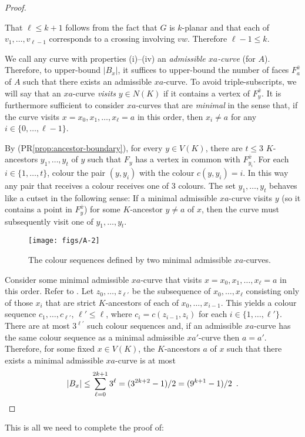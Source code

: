 \documentclass{patmorin}
\renewcommand{\propref}[1]{(PR\ref{prop:#1})}
\begin{document}
\begin{proof}
\begin{compactenum}[(i)]
    \item That $\ell\le k+1$ follows from the fact that $G$ is $k$-planar and that each of $v_1,\ldots,v_{\ell-1}$ corresponds to a crossing involving $vw$.  Therefore $\ell-1\le k$.
  \end{compactenum}
  We call any curve with properties (i)--(iv) an \emph{admissible $xa$-curve} (for $A$).  Therefore, to upper-bound $|B_x|$, it suffices to upper-bound the number of faces $F^{\bar{x}}_a$ of $A$ such that there exists an admissible $xa$-curve. To avoid triple-subscripts, we will say that an $xa$-curve \emph{visits} $y\in N(K)$ if it contains a vertex of $F^{\bar{x}}_y$.  It is furthermore sufficient to consider $xa$-curves that are \emph{minimal} in the sense that, if the curve visits $x=x_0,x_1,\ldots,x_\ell=a$ in this order, then $x_i\neq a$ for any $i\in\{0,\ldots,\ell-1\}$.

  By \propref{ancestor-boundary}, for every $y\in V(K)$, there are $t\le 3$ $K$-ancestors $y_1,\ldots,y_t$ of $y$ such that $F_y$ has a vertex in common with $F^{\bar{x}}_{y_i}$. For each $i\in\{1,\ldots,t\}$, colour the pair $(y,y_i)$ with the colour $c(y,y_i)=i$. In this way any pair that receives a colour receives one of 3 colours.  The set $y_1,\ldots,y_t$ behaves like a cutset in the following sense:  If a minimal admissible $xa$-curve visits $y$ (so it contains a point in $F^{\bar{x}}_y$) for some $K$-ancestor $y\neq a$ of $x$, then the curve must subsequently visit one of $y_1,\ldots,y_t$.

  \begin{figure}
    \begin{center}
        \texttt{[image: figs/A-2]}
    \end{center}
    \caption{The colour sequences defined by two minimal admissible $xa$-curves.}
  \end{figure}

  Consider some minimal admissible $xa$-curve that visits $x=x_0,x_1,\ldots,x_\ell=a$ in this order.  Refer to .  Let $z_0,\ldots,z_{\ell'}$ be the subsequence of $x_0,\ldots,x_\ell$ consisting only of those $x_i$ that are strict $K$-ancestors of each of $x_0,\ldots,x_{i-1}$.  This yields a colour sequence $c_1,\ldots,c_{\ell'}$, $\ell'\le \ell$, where $c_i=c(z_{i-1},z_i)$ for each $i\in\{1,\ldots,\ell'\}$.   There are at most $3^{\ell'}$ such colour sequences and, if an admissible $xa$-curve has the same colour sequence as a minimal admissible $xa'$-curve then $a=a'$.  Therefore, for some fixed $x\in V(K)$, the $K$-ancestors $a$ of $x$ such that there exists a minimal admissible $xa$-curve is at most
  \begin{equation}
     |B_x| \le \sum_{\ell=0}^{2k+1} 3^\ell = (3^{2k+2}-1)/2 
         = (9^{k+1}-1)/2 \enspace .  \eqlabel{bag-size}
  \end{equation}
\end{proof}
This is all we need to complete the proof of:
\end{document}
